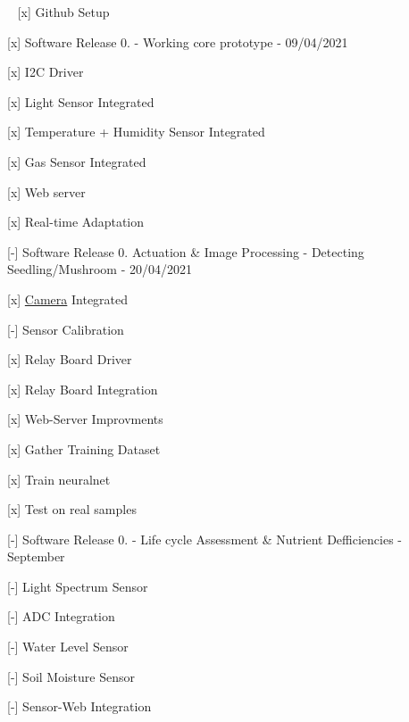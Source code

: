 ~\newline
 \mbox{[}x\mbox{]} Github Setup

\mbox{[}x\mbox{]} Software Release 0. -\/ Working core prototype -\/ 09/04/2021
\begin{DoxyItemize}
\item \mbox{[}x\mbox{]} I2C Driver
\item \mbox{[}x\mbox{]} Light Sensor Integrated
\item \mbox{[}x\mbox{]} Temperature + Humidity Sensor Integrated
\item \mbox{[}x\mbox{]} Gas Sensor Integrated
\item \mbox{[}x\mbox{]} Web server
\item \mbox{[}x\mbox{]} Real-\/time Adaptation
\end{DoxyItemize}

\mbox{[}-\/\mbox{]} Software Release 0. Actuation \& Image Processing -\/ Detecting Seedling/\+Mushroom -\/ 20/04/2021
\begin{DoxyItemize}
\item \mbox{[}x\mbox{]} \hyperlink{classCamera}{Camera} Integrated
\item \mbox{[}-\/\mbox{]} Sensor Calibration
\item \mbox{[}x\mbox{]} Relay Board Driver
\item \mbox{[}x\mbox{]} Relay Board Integration
\item \mbox{[}x\mbox{]} Web-\/\+Server Improvments
\item \mbox{[}x\mbox{]} Gather Training Dataset
\item \mbox{[}x\mbox{]} Train neuralnet
\item \mbox{[}x\mbox{]} Test on real samples
\end{DoxyItemize}

\mbox{[}-\/\mbox{]} Software Release 0. -\/ Life cycle Assessment \& Nutrient Defficiencies -\/ September
\begin{DoxyItemize}
\item \mbox{[}-\/\mbox{]} Light Spectrum Sensor
\item \mbox{[}-\/\mbox{]} A\+DC Integration
\item \mbox{[}-\/\mbox{]} Water Level Sensor
\item \mbox{[}-\/\mbox{]} Soil Moisture Sensor
\item \mbox{[}-\/\mbox{]} Sensor-\/\+Web Integration ~\newline
 
\end{DoxyItemize}